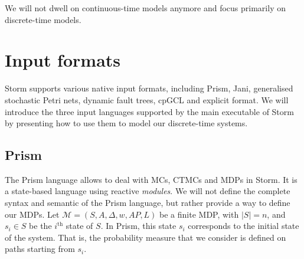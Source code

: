 We will not dwell on continuous-time models anymore and focus primarily on discrete-time models.

\section{Input formats}
Storm supports various native input formats, including Prism, Jani, generalised stochastic Petri nets, dynamic fault trees, cpGCL and explicit format.
We will introduce the three input languages supported by the main executable of Storm by presenting how to use them to model our
discrete-time systems.
\subsection{Prism} \label{prism-subsec}
The Prism language \cite{prismsynt} allows to deal with MCs, CTMCs and MDPs in Storm.
It is a state-based language using reactive \textit{modules}.
We will not define the complete syntax and semantic of the Prism language, but rather provide a way to
define our MDPs.
Let $\mathcal{M} = (S, A, \Delta, w, AP, L)$ be a finite MDP, with $|S| = n$, and $s_i \in S$ be the $i^{\text{th}}$ state of $S$.
In Prism, this state $s_i$ corresponds to the initial state of the system. That is, the probability measure that we consider is defined on paths starting from $s_i$.\\

